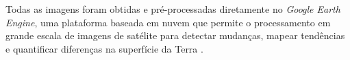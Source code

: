 Todas as imagens foram obtidas e pré-processadas diretamente no \emph{Google Earth Engine},  uma plataforma baseada em nuvem que permite o processamento em grande escala de imagens de satélite para detectar mudanças, mapear tendências e quantificar diferenças na superfície da Terra \cite{gorelick2017google}. 



\renewcommand{\cleardoublepage}{}
\renewcommand{\clearpage}{}
\vspace{5mm}